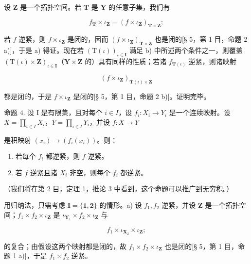 设 \(\mathbf{Z}\) 是一个拓扑空间。若 \(\mathbf{T}\) 是 \(\mathbf{Y}\) 的任意子集，我们有

\[
f _ {\mathbf {T}} \times \iota_ {\mathbf {Z}} = (f \times \iota_ {\mathbf {Z}}) _ {\mathbf {T} \times \mathbf {Z}};
\]

若 \(f\) 逆紧，则 \(f \times \iota_{\mathbf{Z}}\) 是闭的，因而 \((f \times \iota_{\mathbf{Z}})_{\mathbf{T} \times \mathbf{Z}}\) 也是闭的{[}§ 5，第 1 目，命题 2 a){]}，于是 a) 得证。现在若 \((\mathrm{T}(\iota))_{\iota \in \mathbf{I}}\) 满足 b) 中所述两个条件之一，则覆盖 \((\mathrm{T}(\iota) \times \mathbf{Z})_{\iota \in \mathbf{I}}\)（\(\mathbf{Y} \times \mathbf{Z}\) 的）具有同样的性质；若诸 \(f_{\mathbf{T}(\iota)}\) 逆紧，则诸映射

\[
(f \times \iota_ {\mathbf {Z}}) _ {\mathbf {T} (\iota) \times \mathbf {Z}}
\]

都是闭的，于是 \(f \times \iota_{\mathbf{Z}}\) 是闭的{[}§ 5，第 1 目，命题 2 b){]}。证明完毕。

命题 4. 设 I 是有限集，且对每个 \(i \in I\)，设 \(f_i: X_i \to Y_i\) 是一个连续映射。设 \(X = \prod_{i \in I} X_i\)，\(Y = \prod_{i \in I} Y_i\)，并设 \(f: X \to Y\)

是积映射 \((x_{i})\to (f_{i}(x_{i}))\)。则：

\begin{enumerate}
\def\labelenumi{\alph{enumi})}
\item
  若每个 \(f_i\) 都逆紧，则 \(f\) 逆紧。
\item
  若 \(f\) 逆紧且诸 \(X_i\) 非空，则每个 \(f_i\) 都逆紧。
\end{enumerate}

（我们将在第 2 目，定理 1，推论 3 中看到，这个命题可以推广到无穷积。）

用归纳法，只需考虑 \(\mathbf{I} = \{\mathbf{1},\mathbf{2}\}\) 的情形。a) 设 \(f_{1}, f_{2}\) 逆紧，并设 \(\mathbf{Z}\) 是一个拓扑空间；\(f_{1} \times f_{2} \times \iota_{\mathbf{Z}}\) 是 \(\iota_{\mathbf{Y}_1} \times f_2 \times \iota_{\mathbf{Z}}\) 与

\[
f _ {1} \times \iota_ {\mathbf {X} _ {2}} \times \iota_ {\mathbf {Z}};
\]

的复合；由假设这两个映射都是闭的，故 \(f_{1} \times f_{2} \times \iota_{\mathbf{Z}}\) 也是闭的{[}§ 5，第 1 目，命题 1 a){]}，于是 \(f_{1} \times f_{2}\) 逆紧。

